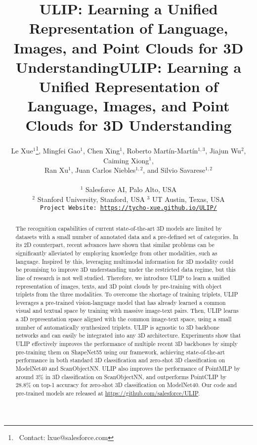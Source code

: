 \title{ULIP: Learning a Unified Representation of Language, Images, and Point Clouds for 3D Understanding}



\title{ULIP: Learning a Unified Representation of Language, Images, and Point Clouds for 3D Understanding}
\author{Le Xue$^{1}$\thanks{\ Contact: lxue@salesforce.com},
Mingfei Gao$^{1}$,
Chen Xing$^{1}$,
Roberto Martín-Martín$^{1, 3}$,
Jiajun Wu$^{2}$,
Caiming Xiong$^{1}$,
\\
Ran Xu$^{1}$,
Juan Carlos Niebles$^{1, 2}$, and
Silvio Savarese$^{1, 2}$
\\
\\
$^{1}$ Salesforce AI, Palo Alto, USA \\
$^{2}$ Stanford University, Stanford, USA \quad ${^3}$ UT Austin, Texas, USA \\
{\tt\small Project Website: \href{https://tycho-xue.github.io/ULIP/}{https://tycho-xue.github.io/ULIP/}}}

\maketitle

\begin{abstract}
The recognition capabilities of current state-of-the-art 3D models are limited by datasets with a small number of annotated data and a pre-defined set of categories.
In its 2D counterpart, recent advances have shown that similar problems can be significantly alleviated by employing knowledge from other modalities, such as language.
Inspired by this, leveraging multimodal information for 3D modality could be promising to improve 3D understanding under the restricted data regime, but this line of research is not well studied.
Therefore, we introduce ULIP to learn a unified representation of images, texts, and 3D point clouds by pre-training with object triplets from the three modalities.
To overcome the shortage of training triplets, ULIP leverages a pre-trained vision-language model that has already learned a common visual and textual space by training with massive image-text pairs. Then, ULIP learns a 3D representation space aligned with the common image-text space, using a small number of automatically synthesized triplets.
ULIP is agnostic to 3D backbone networks and can easily be integrated into any 3D architecture.
Experiments show that ULIP effectively improves the performance of multiple recent 3D backbones by simply pre-training them on ShapeNet55 using our framework, achieving state-of-the-art performance in both standard 3D classification and zero-shot 3D classification on ModelNet40 and ScanObjectNN. ULIP also improves the performance of PointMLP by around 3\% in 3D classification on ScanObjectNN, and outperforms PointCLIP by 28.8\% on top-1 accuracy for zero-shot 3D classification on ModelNet40. Our code and pre-trained models are released at \href{https://github.com/salesforce/ULIP}{https://github.com/salesforce/ULIP}.
\end{abstract}

